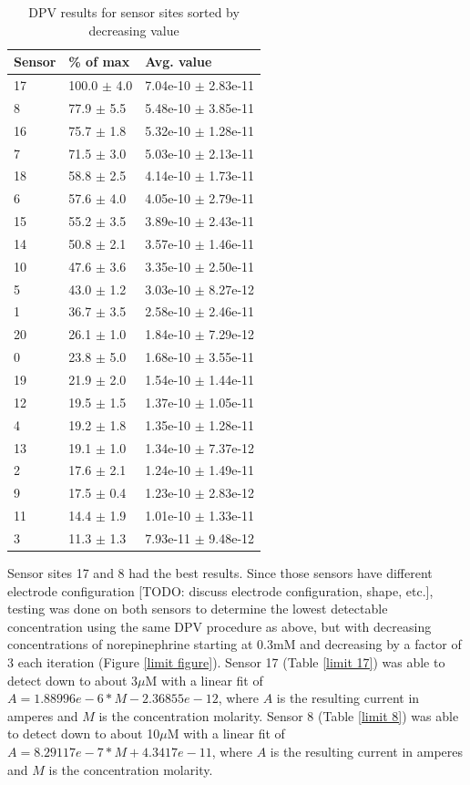 \begin{table}
	\begin{tabular}{lll}
		Sensor & \% of max & Avg. value \\
		\hline
		17 & 100.0 $\pm$ 4.0 & 7.04e-10 $\pm$ 2.83e-11 \\
		8 & 77.9 $\pm$ 5.5 & 5.48e-10 $\pm$ 3.85e-11 \\
		16 & 75.7 $\pm$ 1.8 & 5.32e-10 $\pm$ 1.28e-11 \\
		7 & 71.5 $\pm$ 3.0 & 5.03e-10 $\pm$ 2.13e-11 \\
		18 & 58.8 $\pm$ 2.5 & 4.14e-10 $\pm$ 1.73e-11 \\
		6 & 57.6 $\pm$ 4.0 & 4.05e-10 $\pm$ 2.79e-11 \\
		15 & 55.2 $\pm$ 3.5 & 3.89e-10 $\pm$ 2.43e-11 \\
		14 & 50.8 $\pm$ 2.1 & 3.57e-10 $\pm$ 1.46e-11 \\
		10 & 47.6 $\pm$ 3.6 & 3.35e-10 $\pm$ 2.50e-11 \\
		5 & 43.0 $\pm$ 1.2 & 3.03e-10 $\pm$ 8.27e-12 \\
		1 & 36.7 $\pm$ 3.5 & 2.58e-10 $\pm$ 2.46e-11 \\
		20 & 26.1 $\pm$ 1.0 & 1.84e-10 $\pm$ 7.29e-12 \\
		0 & 23.8 $\pm$ 5.0 & 1.68e-10 $\pm$ 3.55e-11 \\
		19 & 21.9 $\pm$ 2.0 & 1.54e-10 $\pm$ 1.44e-11 \\
		12 & 19.5 $\pm$ 1.5 & 1.37e-10 $\pm$ 1.05e-11 \\
		4 & 19.2 $\pm$ 1.8 & 1.35e-10 $\pm$ 1.28e-11 \\
		13 & 19.1 $\pm$ 1.0 & 1.34e-10 $\pm$ 7.37e-12 \\
		2 & 17.6 $\pm$ 2.1 & 1.24e-10 $\pm$ 1.49e-11 \\
		9 & 17.5 $\pm$ 0.4 & 1.23e-10 $\pm$ 2.83e-12 \\
		11 & 14.4 $\pm$ 1.9 & 1.01e-10 $\pm$ 1.33e-11 \\
		3 & 11.3 $\pm$ 1.3 & 7.93e-11 $\pm$ 9.48e-12
	\end{tabular}
	\caption[DPV results for sensor sites]{DPV results for sensor sites sorted by decreasing value}
	\label{DPV results}
\end{table}

Sensor sites 17 and 8 had the best results. Since those sensors have different electrode configuration [TODO: discuss electrode configuration, shape, etc.], testing was done on both sensors to determine the lowest detectable concentration using the same DPV procedure as above, but with decreasing concentrations of norepinephrine starting at 0.3mM and decreasing by a factor of 3 each iteration (Figure \ref{limit figure}). Sensor 17 (Table \ref{limit 17}) was able to detect down to about 3$\mu$M with a linear fit of $A = 1.88996e-6 * M - 2.36855e-12$, where $A$ is the resulting current in amperes and $M$ is the concentration molarity. Sensor 8 (Table \ref{limit 8}) was able to detect down to about 10$\mu$M with a linear fit of $A = 8.29117e-7 * M + 4.3417e-11$, where $A$ is the resulting current in amperes and $M$ is the concentration molarity.


